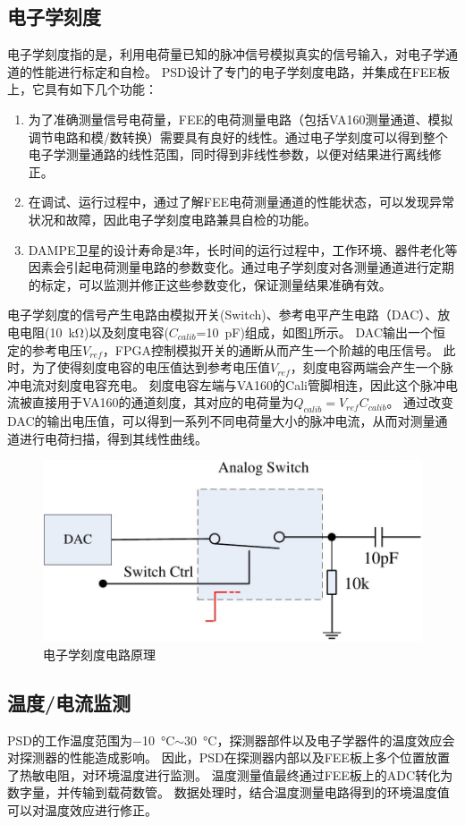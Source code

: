 \subsection{电子学刻度}
电子学刻度指的是，利用电荷量已知的脉冲信号模拟真实的信号输入，对电子学通道的性能进行标定和自检。
PSD设计了专门的电子学刻度电路，并集成在FEE板上，它具有如下几个功能：
\begin{enumerate}
	\item 为了准确测量信号电荷量，FEE的电荷测量电路（包括VA160测量通道、模拟调节电路和模/数转换）需要具有良好的线性。通过电子学刻度可以得到整个电子学测量通路的线性范围，同时得到非线性参数，以便对结果进行离线修正。
	\item 在调试、运行过程中，通过了解FEE电荷测量通道的性能状态，可以发现异常状况和故障，因此电子学刻度电路兼具自检的功能。
	\item DAMPE卫星的设计寿命是3年，长时间的运行过程中，工作环境、器件老化等因素会引起电荷测量电路的参数变化。通过电子学刻度对各测量通道进行定期的标定，可以监测并修正这些参数变化，保证测量结果准确有效。
\end{enumerate}

电子学刻度的信号产生电路由模拟开关(Switch)、参考电平产生电路（DAC）、放电电阻(\SI{10}{\kilo\ohm})以及刻度电容($C_{calib}$=\SI{10}{\pico\farad})组成，如图\ref{fig:description:fee_calibration}所示。
DAC输出一个恒定的参考电压$V_{ref}$，FPGA控制模拟开关的通断从而产生一个阶越的电压信号。
此时，为了使得刻度电容的电压值达到参考电压值$V_{ref}$，刻度电容两端会产生一个脉冲电流对刻度电容充电。
刻度电容左端与VA160的Cali管脚相连，因此这个脉冲电流被直接用于VA160的通道刻度，其对应的电荷量为$Q_{calib}=V_{ref}C_{calib}$。
通过改变DAC的输出电压值，可以得到一系列不同电荷量大小的脉冲电流，从而对测量通道进行电荷扫描，得到其线性曲线。

\begin{figure}[h!]
\centering
\includegraphics[width=0.7\linewidth]{chap/description/fig/fee_calibration}
\caption{电子学刻度电路原理}
\label{fig:description:fee_calibration}
\end{figure}


\subsection{温度/电流监测}
PSD的工作温度范围为\SI{-10}{\celsius}$\sim$\SI{30}{\celsius}，探测器部件以及电子学器件的温度效应会对探测器的性能造成影响。
因此，PSD在探测器内部以及FEE板上多个位置放置了热敏电阻，对环境温度进行监测。
温度测量值最终通过FEE板上的ADC转化为数字量，并传输到载荷数管。
数据处理时，结合温度测量电路得到的环境温度值可以对温度效应进行修正。

